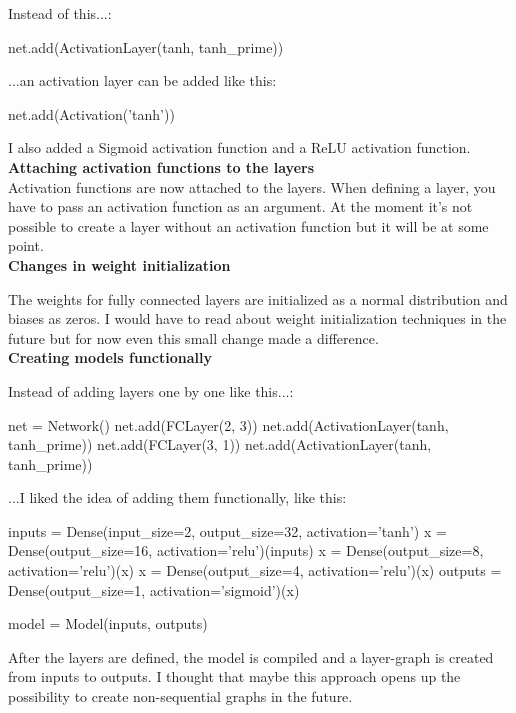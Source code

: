 \documentclass{article}
\begin{document}
Instead of this...:
\begin{python}
    net.add(ActivationLayer(tanh, tanh_prime))
\end{python}
...an activation layer can be added like this:
\begin{python}
    net.add(Activation('tanh'))
\end{python}

I also added a Sigmoid activation function and a ReLU activation function. \\

\textbf{Attaching activation functions to the layers} \\

Activation functions are now attached to the layers. When defining a layer, you have to pass an activation function as an
argument. At the moment it's not possible to create a layer without an activation function but it will be at some point. \\

\textbf{Changes in weight initialization}

The weights for fully connected layers are initialized as a normal distribution and biases as zeros. I would have to read about 
weight initialization techniques in the future but for now even this small change made a difference. \\

\textbf{Creating models functionally}

Instead of adding layers one by one like this...:
\begin{python}
net = Network()
net.add(FCLayer(2, 3))
net.add(ActivationLayer(tanh, tanh_prime))
net.add(FCLayer(3, 1))
net.add(ActivationLayer(tanh, tanh_prime))
\end{python}

...I liked the idea of adding them functionally, like this:
\begin{python}
inputs = Dense(input_size=2, output_size=32, activation='tanh')
x = Dense(output_size=16, activation='relu')(inputs)
x = Dense(output_size=8, activation='relu')(x)
x = Dense(output_size=4, activation='relu')(x)
outputs = Dense(output_size=1, activation='sigmoid')(x)

model = Model(inputs, outputs)
\end{python}

After the layers are defined, the model is compiled and a layer-graph is created from inputs to outputs. 
I thought that maybe this approach opens up the possibility to create non-sequential graphs in the future. \\
\end{document}

